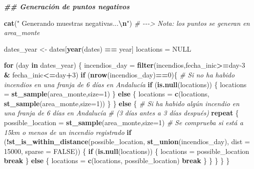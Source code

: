 \documentclass[12pt,a4paper,]{book}
\newenvironment{Shaded}{\begin{snugshade}}{\end{snugshade}}
\newcommand{\AttributeTok}[1]{\textcolor[rgb]{0.13,0.29,0.53}{#1}}
\newcommand{\CommentTok}[1]{\textcolor[rgb]{0.56,0.35,0.01}{\textit{#1}}}
\newcommand{\ConstantTok}[1]{\textcolor[rgb]{0.56,0.35,0.01}{#1}}
\newcommand{\ControlFlowTok}[1]{\textcolor[rgb]{0.13,0.29,0.53}{\textbf{#1}}}
\newcommand{\DecValTok}[1]{\textcolor[rgb]{0.00,0.00,0.81}{#1}}
\newcommand{\DocumentationTok}[1]{\textcolor[rgb]{0.56,0.35,0.01}{\textbf{\textit{#1}}}}
\newcommand{\FunctionTok}[1]{\textcolor[rgb]{0.13,0.29,0.53}{\textbf{#1}}}
\newcommand{\NormalTok}[1]{#1}
\newcommand{\OtherTok}[1]{\textcolor[rgb]{0.56,0.35,0.01}{#1}}
\newcommand{\SpecialCharTok}[1]{\textcolor[rgb]{0.81,0.36,0.00}{\textbf{#1}}}
\newcommand{\StringTok}[1]{\textcolor[rgb]{0.31,0.60,0.02}{#1}}
\numberwithin{dummy}{section}
\theoremstyle{ocrenumbox}
\theoremstyle{blacknumex}
\theoremstyle{blacknumbox}
\theoremstyle{ocrenum}
\theoremstyle{ocrenum}
\begin{document}
\begin{Shaded}
\begin{Highlighting}[]
  \DocumentationTok{\#\# Generación de puntos negativos}
  
  \FunctionTok{cat}\NormalTok{(}\StringTok{"  Generando muestras negativas...}\SpecialCharTok{\textbackslash{}n}\StringTok{"}\NormalTok{)}
  \CommentTok{\# {-}{-}{-}\textgreater{} Nota: los puntos se generan en area\_monte}
  
\NormalTok{  dates\_year }\OtherTok{\textless{}{-}}\NormalTok{ dates[}\FunctionTok{year}\NormalTok{(dates) }\SpecialCharTok{==}\NormalTok{ year]}
\NormalTok{  locations }\OtherTok{=} \ConstantTok{NULL}
  
  \ControlFlowTok{for}\NormalTok{ (day }\ControlFlowTok{in}\NormalTok{ dates\_year) \{}
\NormalTok{    incendios\_day }\OtherTok{=} \FunctionTok{filter}\NormalTok{(incendios,fecha\_inic}\SpecialCharTok{\textgreater{}=}\NormalTok{day}\DecValTok{{-}3} \SpecialCharTok{\&}\NormalTok{ fecha\_inic}\SpecialCharTok{\textless{}=}\NormalTok{day}\SpecialCharTok{+}\DecValTok{3}\NormalTok{)}
    \ControlFlowTok{if}\NormalTok{ (}\FunctionTok{nrow}\NormalTok{(incendios\_day)}\SpecialCharTok{==}\DecValTok{0}\NormalTok{)\{ }
      \CommentTok{\# Si no ha habido incendios en una franja de 6 días en Andalucía}
      \ControlFlowTok{if}\NormalTok{ (}\FunctionTok{is.null}\NormalTok{(locations)) \{}
\NormalTok{        locations }\OtherTok{=} \FunctionTok{st\_sample}\NormalTok{(area\_monte,}\AttributeTok{size=}\DecValTok{1}\NormalTok{) }
\NormalTok{      \} }\ControlFlowTok{else}\NormalTok{ \{}
\NormalTok{        locations }\OtherTok{=} \FunctionTok{c}\NormalTok{(locations, }\FunctionTok{st\_sample}\NormalTok{(area\_monte,}\AttributeTok{size=}\DecValTok{1}\NormalTok{))}
\NormalTok{      \}}
\NormalTok{    \} }\ControlFlowTok{else}\NormalTok{ \{ }
      \CommentTok{\# Si ha habido algún incendio en una franja de 6 días en Andalucía }
      \CommentTok{\# (3 días antes a 3 días después)}
      \ControlFlowTok{repeat}\NormalTok{ \{}
\NormalTok{        possible\_location }\OtherTok{=} \FunctionTok{st\_sample}\NormalTok{(area\_monte,}\AttributeTok{size=}\DecValTok{1}\NormalTok{)}
        \CommentTok{\# Se comprueba si está a 15km o menos de un incendio registrado}
        \ControlFlowTok{if}\NormalTok{ (}\SpecialCharTok{!}\FunctionTok{st\_is\_within\_distance}\NormalTok{(possible\_location, }
                                   \FunctionTok{st\_union}\NormalTok{(incendios\_day), }
                                   \AttributeTok{dist =} \DecValTok{15000}\NormalTok{, }\AttributeTok{sparse =} \ConstantTok{FALSE}\NormalTok{)) \{}
          \ControlFlowTok{if}\NormalTok{ (}\FunctionTok{is.null}\NormalTok{(locations)) \{}
\NormalTok{            locations }\OtherTok{=}\NormalTok{ possible\_location}
            \ControlFlowTok{break}
\NormalTok{          \} }\ControlFlowTok{else}\NormalTok{ \{}
\NormalTok{            locations }\OtherTok{=} \FunctionTok{c}\NormalTok{(locations, possible\_location)}
            \ControlFlowTok{break}
\NormalTok{          \}}
\NormalTok{        \}}
\NormalTok{      \}}
\NormalTok{    \}}
\NormalTok{  \}}
  

\end{Highlighting}
\end{Shaded}
\end{document}
